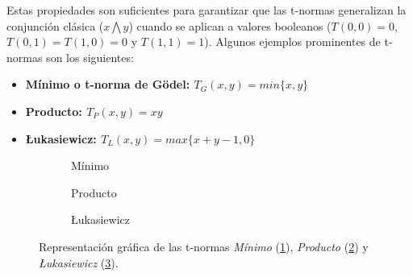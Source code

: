 Estas propiedades son suficientes para garantizar que las t-normas generalizan la conjunción clásica ($x\bigwedge y$) cuando se aplican a valores booleanos ($T(0,0)=0$,$T(0,1)=T(1,0)=0$ y $T(1,1)=1$).
Algunos ejemplos prominentes de t-normas son los siguientes:
\begin{itemize}
	\item \bfseries Mínimo o t-norma de Gödel: $T_{G}(x,y) = min\{x,y\}$
	\item \bfseries Producto: $T_{P}(x,y) = xy$
	\item \bfseries \L{}ukasiewicz: $T_{L}(x,y) = max\{x+y-1,0\}$
\end{itemize}
\begin{figure}[H]
	\centering
	\begin{subfigure}[b]{0.45\textwidth}
		\newlength\figureheight 
		\newlength\figurewidth
		\setlength\figureheight{4.5cm}
		\setlength\figurewidth{6cm}
		
		\caption{Mínimo}
		\label{fig:t-norms-min}
	\end{subfigure}
	\qquad
	\begin{subfigure}[b]{0.45\textwidth}
		\setlength\figureheight{4.5cm}
		\setlength\figurewidth{6cm}
		
		\caption{Producto}
		\label{fig:t-norms-prod}
	\end{subfigure}
	
	\vspace{1 cm}
	\begin{subfigure}[b]{0.45\textwidth}
		\setlength\figureheight{4.5cm}
		\setlength\figurewidth{6cm}
		
		\caption{\L{}ukasiewicz}
		\label{fig:t-norms-lukasiewicz}
	\end{subfigure}
	\label{fig:t-norms}
	\caption{Representación gráfica de las t-normas \emph{Mínimo} (\ref{fig:t-norms-min}), \emph{Producto} (\ref{fig:t-norms-prod}) y \emph{\L{}ukasiewicz} (\ref{fig:t-norms-lukasiewicz}).}
\end{figure}

